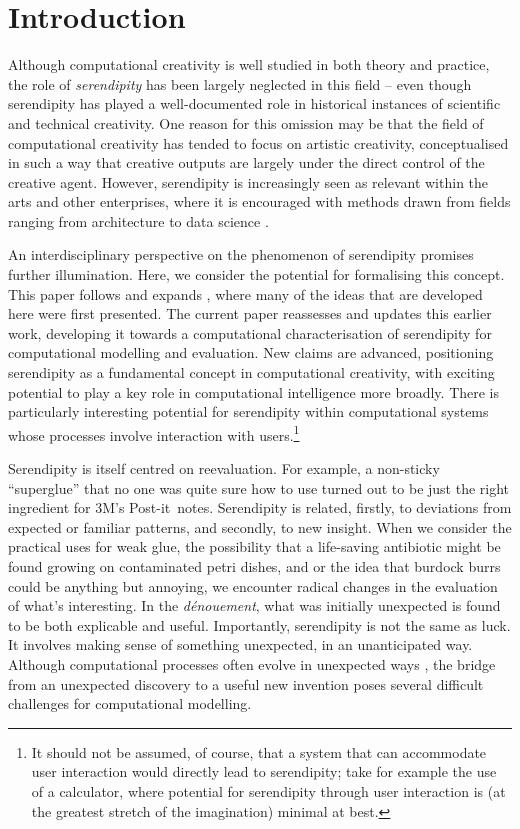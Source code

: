 \section{Introduction}

Although computational creativity is well studied in both theory and
practice, the role of \emph{serendipity} has been largely neglected
in this field -- even though serendipity has played a well-documented
role in historical instances of scientific and technical creativity.
One reason for this omission may be that the field of computational
creativity has tended to focus on artistic creativity, conceptualised in such a way that creative outputs are largely under the direct control of the creative agent.  However,  serendipity is increasingly seen as relevant within the arts
\cite{mckay-serendipity} and other enterprises, where it is encouraged with methods drawn from fields ranging from architecture to data science \cite{kakko2009homo,engineering-serendipity}. 


An interdisciplinary perspective on the phenomenon of serendipity
promises further illumination.  Here, we consider the potential for
formalising this concept. 
  This paper follows and expands , where many of the ideas that are developed here were first presented.  The current paper reassesses and updates this earlier work, developing it towards a computational characterisation of serendipity for computational modelling and evaluation. New claims are advanced, positioning serendipity as a fundamental concept in computational creativity, with exciting potential to play a key role in computational intelligence more broadly.  There is particularly interesting potential for serendipity within computational systems whose processes involve interaction with users.\footnote{It should not be assumed, of course, that a system that can accommodate user interaction would directly lead to serendipity; take for example the use of a calculator, where potential for serendipity through user interaction is (at the greatest stretch of the imagination) minimal at best.} 

Serendipity is itself centred on reevaluation.  For example, a
non-sticky ``superglue'' that no one was quite sure how to use turned
out to be just the right ingredient for 3M's
Post-it\texttrademark\ notes.
%
Serendipity is related, firstly, to deviations from expected or
familiar patterns, and secondly, to new insight.
%
When we consider the practical uses for weak glue, the possibility
that a life-saving antibiotic might be found growing on contaminated
petri dishes, and or the idea that burdock burrs could be anything but
annoying, we encounter radical changes in the evaluation of what's
interesting.  In the \emph{d\'enouement}, what was initially
unexpected is found to be both explicable and useful.  Importantly,
serendipity is not the same as luck.  It involves making sense of
something unexpected, in an unanticipated way.  Although computational
processes often evolve in unexpected ways
\cite{minsky1967programming}, the bridge from an unexpected discovery
to a useful new invention poses several difficult challenges for
computational modelling.

